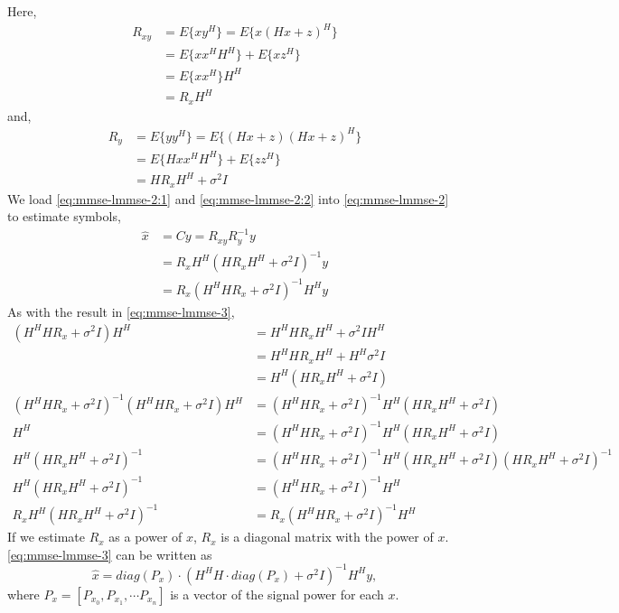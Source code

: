 \documentclass{article}
\begin{document}
Here, 
\begin{equation}
\begin{split}
R_{xy} &= E\{xy^H\} = E\{ x(Hx + z)^H\} \\
&= E\{ xx^HH^H \} + E\{ xz^H \} \\
&= E\{ xx^H \}H^H \\
&= R_x H^H
\end{split}
\label{eq:mmse-lmmse-2:1}
\end{equation}
and,
\begin{equation}
\begin{split}
R_y &= E\{yy^H\} = E\{(Hx + z)(Hx + z)^H\} \\
&= E\{Hxx^HH^H\} + E\{zz^H\} \\
&= HR_xH^H + \sigma^2I  
\end{split}
\label{eq:mmse-lmmse-2:2}
\end{equation}
We load \eqref{eq:mmse-lmmse-2:1} and \eqref{eq:mmse-lmmse-2:2} into \eqref{eq:mmse-lmmse-2} to estimate symbols,
\begin{equation}
\begin{split}
\hat{x} &= Cy = R_{xy}R_{y}^{-1}y \\
&= R_x H^H (HR_xH^H + \sigma^2I )^{-1}y \\
&= R_x (H^HHR_x + \sigma^2I )^{-1} H^Hy 
\end{split}
\label{eq:mmse-lmmse-3}
\end{equation}
As with the result in \eqref{eq:mmse-lmmse-3},
\begin{equation}
\begin{split}
(H^HHR_x + \sigma^2I) H^H &= H^HHR_xH^H + \sigma^2IH^H \\ 
&= H^HHR_xH^H + H^H\sigma^2I \\
&= H^H(HR_xH^H + \sigma^2I) \\
(H^HHR_x + \sigma^2I)^{-1}(H^HHR_x + \sigma^2I) H^H &= (H^HHR_x + \sigma^2I)^{-1}H^H(HR_xH^H + \sigma^2I)\\
H^H &= (H^HHR_x + \sigma^2I)^{-1}H^H(HR_xH^H + \sigma^2I)\\
H^H(HR_xH^H + \sigma^2I)^{-1} &= (H^HHR_x + \sigma^2I)^{-1}H^H(HR_xH^H + \sigma^2I)(HR_xH^H + \sigma^2I)^{-1}\\
H^H(HR_xH^H + \sigma^2I)^{-1} &= (H^HHR_x + \sigma^2I)^{-1}H^H \\
R_xH^H(HR_xH^H + \sigma^2I)^{-1} &= R_x(H^HHR_x + \sigma^2I)^{-1}H^H
\end{split}
\label{eq:mmse-lmmse-4}
\end{equation}
If we estimate $R_x$ as a power of $x$, $R_x$ is a diagonal matrix with the power of $x$. \eqref{eq:mmse-lmmse-3} can be written as
\begin{equation}
\hat{x} = diag(P_x)\cdot (H^HH\cdot diag(P_x) + \sigma^2I )^{-1} H^Hy, 
\end{equation}
where $P_x = [P_{x_0}, P_{x_1}, \cdots P_{x_n}]$ is a vector of the signal power for each $x$.
\end{document}
